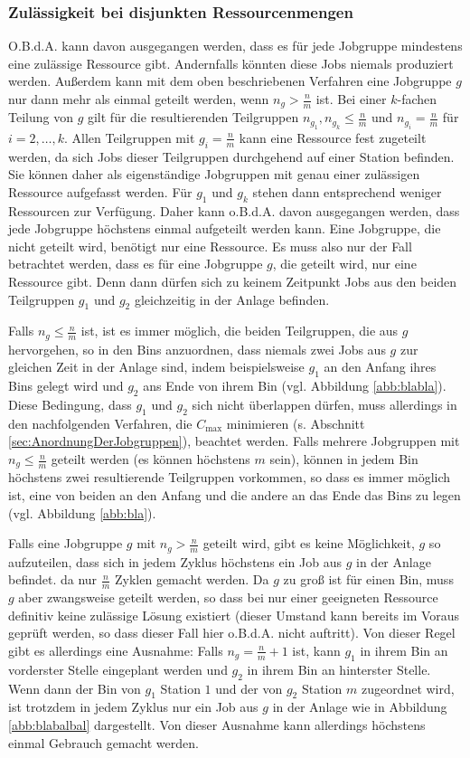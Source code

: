 \documentclass{scrreprt}
\begin{document}
\subsubsection{Zulässigkeit bei disjunkten Ressourcenmengen}
O.B.d.A. kann davon ausgegangen werden, dass es für jede Jobgruppe mindestens eine zulässige Ressource gibt.
Andernfalls könnten diese Jobs niemals produziert werden.
Außerdem kann mit dem oben beschriebenen Verfahren eine Jobgruppe $g$ nur dann mehr als einmal geteilt werden, wenn $n_g > \frac{n}{m}$ ist.
Bei einer $k$-fachen Teilung von $g$ gilt für die resultierenden Teilgruppen $n_{g_1},n_{g_k}\leq\frac{n}{m}$ und $n_{g_i}=\frac{n}{m}$ für $i=2,\ldots,k$.
Allen Teilgruppen mit $g_i=\frac{n}{m}$ kann eine Ressource fest zugeteilt werden, da sich Jobs dieser Teilgruppen durchgehend auf einer Station befinden.
Sie können daher als eigenständige Jobgruppen mit genau einer zulässigen Ressource aufgefasst werden.
Für $g_1$ und $g_k$ stehen dann entsprechend weniger Ressourcen zur Verfügung.
Daher kann o.B.d.A. davon ausgegangen werden, dass jede Jobgruppe höchstens einmal aufgeteilt werden kann.
Eine Jobgruppe, die nicht geteilt wird, benötigt nur eine Ressource.
Es muss also nur der Fall betrachtet werden, dass es für eine Jobgruppe $g$, die geteilt wird, nur eine Ressource gibt.
Denn dann dürfen sich zu keinem Zeitpunkt Jobs aus den beiden Teilgruppen $g_1$ und $g_2$ gleichzeitig in der Anlage befinden.

Falls $n_g \leq \frac{n}{m}$ ist, ist es immer möglich, die beiden Teilgruppen, die aus $g$ hervorgehen,
so in den Bins anzuordnen, dass niemals zwei Jobs aus $g$ zur gleichen Zeit in der Anlage sind, indem beispielsweise
$g_1$ an den Anfang ihres Bins gelegt wird und $g_2$ ans Ende von ihrem Bin (vgl. Abbildung \ref{abb:blabla}).
Diese Bedingung, dass $g_1$ und $g_2$ sich nicht überlappen dürfen, muss allerdings in den nachfolgenden Verfahren, 
die $C_{\max}$ minimieren (s. Abschnitt \ref{sec:AnordnungDerJobgruppen}), beachtet werden.
Falls mehrere Jobgruppen mit $n_g\leq\frac{n}{m}$ geteilt werden (es können höchstens $m$ sein), können in jedem Bin höchstens zwei resultierende 
Teilgruppen vorkommen, so dass es immer möglich ist, eine von beiden an den Anfang und die andere an das Ende das Bins zu legen (vgl. Abbildung \ref{abb:bla}).

Falls eine Jobgruppe $g$ mit $n_g > \frac{n}{m}$ geteilt wird,
gibt es keine Möglichkeit, $g$ so aufzuteilen, 
dass sich in jedem Zyklus höchstens ein Job aus $g$ in der Anlage befindet.
da nur $\frac{n}{m}$ Zyklen gemacht werden. 
Da $g$ zu groß ist für einen Bin, muss $g$ aber zwangsweise geteilt werden, so dass bei nur einer geeigneten Ressource definitiv keine zulässige Lösung existiert
(dieser Umstand kann bereits im Voraus geprüft werden, so dass dieser Fall hier o.B.d.A. nicht auftritt).
Von dieser Regel gibt es allerdings eine Ausnahme:
Falls $n_g = \frac{n}{m}+1$ ist, kann $g_1$ in ihrem Bin an vorderster Stelle eingeplant werden und $g_2$ in ihrem Bin an hinterster Stelle.
Wenn dann der Bin von $g_1$ Station $1$ und der von $g_2$ Station $m$ zugeordnet wird, ist trotzdem in jedem Zyklus nur ein Job aus $g$ in der Anlage 
wie in Abbildung \ref{abb:blabalbal} dargestellt.
Von dieser Ausnahme kann allerdings höchstens einmal Gebrauch gemacht werden.
\end{document}
